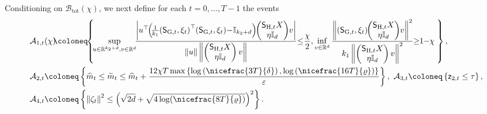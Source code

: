 \documentclass[11pt]{article}
\theoremstyle{definition}
\theoremstyle{plain}
\newcommand{\reals}{\mathbb{R}}
\newcommand{\eps}{{\varepsilon}}
\providecommand{\brI}{\mathbb{I}}
\newcommand{\Norm}[1]{\left\| #1 \right\|}
\providecommand{\norm}[1]{\Norm{#1}}
\renewcommand{\eps}{\varepsilon}
\begin{document}
Conditioning on $\mathcal{B}_{\mathrm{tot}}(\chi)$, we next define for each
$t=0,\ldots,T-1$ the events
\begin{align}
    &\mathcal{A}_{1,t}(\chi) \hspace{-0.3em}\coloneq\hspace{-0.3em} \left\{\hspace{-0.5em}
    \begin{aligned}
        &\sup_{u \in \reals^{k_2+d},v \in \reals^d}
        \hspace{-0.35em}\frac{
            \left|u^\top\hspace{-0.3em}\left(\hspace{-0.2em}\frac{1}{k_1}\hspace{-0.2em}\left(\mathsf{S}_{\mathrm{G},t}, \xi_t\right)^\top\hspace{-0.2em} \left(\mathsf{S}_{\mathrm{G},t}, \xi_t\right)
            \hspace{-0.2em}-\hspace{-0.2em} \brI_{k_2+d}\right)\hspace{-0.3em}\begin{pmatrix}\mathsf{S}_{\mathrm{H}, t}X\\ \eta \brI_d\end{pmatrix}\hspace{-0.2em}v\right|
        }{
            \norm{u}\norm{\begin{pmatrix}\mathsf{S}_{\mathrm{H}, t}X\\ \eta \brI_d\end{pmatrix}v}
        }
        \hspace{-0.25em}\leq\hspace{-0.25em} \frac{\chi}{2}, \inf_{v \in \reals^d}
        \frac{\norm{(\mathsf{S}_{\mathrm{G},t}, \xi_t)\hspace{-0.3em}\begin{pmatrix}\mathsf{S}_{\mathrm{H}, t}X\\ \eta \brI_d\end{pmatrix}\hspace{-0.2em}v}^2}{k_1\norm{\begin{pmatrix}\mathsf{S}_{\mathrm{H}, t}X\\ \eta \brI_d\end{pmatrix}v}^2}
        \hspace{-0.3em}\geq\hspace{-0.3em} 1\hspace{-0.25em}-\hspace{-0.25em}\chi
    \end{aligned}
    \hspace{-0.75em}\right\},\\
    &\mathcal{A}_{2,t} \coloneq \left\{
        \widehat m_t \le \widetilde m_t \le
        \widehat m_t + \frac{12\chi T\max\left\{\log\left(\nicefrac{3T}{\delta}\right), \log\left(\nicefrac{16T}{\varrho}\right)\right\}}{\eps}
    \right\},\ \mathcal{A}_{3,t} \coloneq \left\{\mathsf z_{2,t}\le \tau\right\},\\
    &\mathcal{A}_{4,t} \coloneq \left\{
        \norm{\zeta_t}^2 \le
        \left(\sqrt{2d}+\sqrt{4\log(\nicefrac{8T}{\varrho})}\right)^2
    \right\}.
\end{align}
\end{document}
